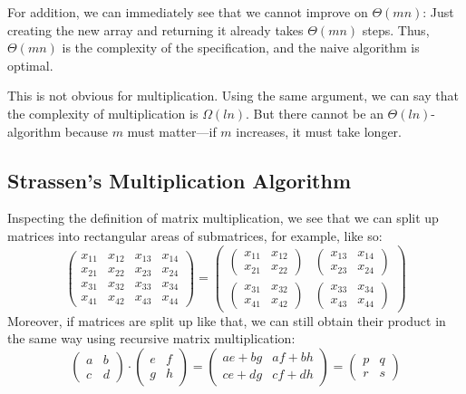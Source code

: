 For addition, we can immediately see that we cannot improve on $\Theta(mn)$: Just creating the new array and returning it already takes $\Theta(mn)$ steps.
Thus, $\Theta(mn)$ is the complexity of the specification, and the naive algorithm is optimal.

This is not obvious for multiplication.
Using the same argument, we can say that the complexity of multiplication is $\Omega(ln)$.
But there cannot be an $\Theta(ln)$-algorithm because $m$ must matter---if $m$ increases, it must take longer.

\subsection{Strassen's Multiplication Algorithm}

Inspecting the definition of matrix multiplication, we see that we can split up matrices into rectangular areas of submatrices, for example, like so:
\[\begin{pmatrix}x_{11} & x_{12} & x_{13} & x_{14} \\ x_{21} & x_{22} & x_{23} & x_{24} \\ x_{31} & x_{32} & x_{33} & x_{34} \\ x_{41} & x_{42} & x_{43} & x_{44}\end{pmatrix}
= \begin{pmatrix}
    \begin{pmatrix}x_{11} & x_{12}\\ x_{21} & x_{22}\end{pmatrix} & \begin{pmatrix} x_{13} & x_{14} \\ x_{23} & x_{24} \end{pmatrix} \\
    \begin{pmatrix}x_{31} & x_{32}\\ x_{41} & x_{42}\end{pmatrix} & \begin{pmatrix} x_{33} & x_{34} \\ x_{43} & x_{44} \end{pmatrix}
  \end{pmatrix}
\]
Moreover, if matrices are split up like that, we can still obtain their product in the same way using recursive matrix multiplication:
\[\begin{pmatrix} a & b \\ c & d\end{pmatrix}\cdot \begin{pmatrix} e & f \\ g & h\end{pmatrix}=
  \begin{pmatrix} ae+bg & af+bh \\ ce+dg & cf+dh\end{pmatrix}=\begin{pmatrix} p & q \\ r & s\end{pmatrix}\]

